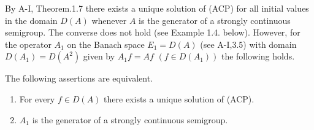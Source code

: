 By A-I, Theorem.1.7 there exists a unique solution of (ACP) for all initial values in the domain $D(A)$ whenever $A$ is the generator of a strongly continuous semigroup.
The converse does not hold (see Example 1.4. below).
However, for the operator $A_{1}$ on the Banach space $E_{1} = D(A)$ (see A-I,3.5) with domain 
$D(A_{1}) = D(A^{2})$ given by $A_{1}f = Af$ $(f \in D(A_{1}))$ the following holds.
\begin{theorem}\label{thm:a2-1.1}
The following assertions are equivalent.
\begin{enumerate}[\upshape (a)]
\item \label{thm:a2-1.1-1}
For every $f \in D(A)$ there exists a unique solution of (ACP).
\item \label{thm:a2-1.1-2}
$A_{1}$ is the generator of a strongly continuous semigroup.
\end{enumerate}
\end{theorem}
